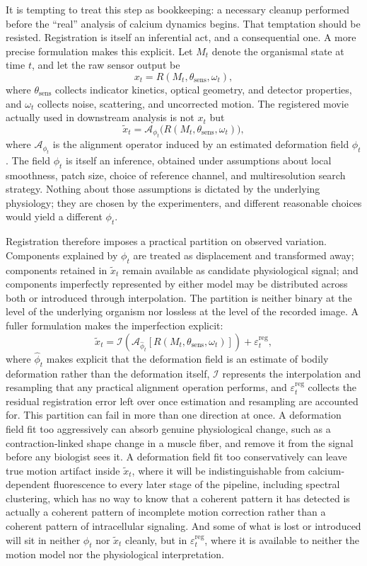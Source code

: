 \documentclass[11pt]{article}
\begin{document}
It is tempting to treat this step as bookkeeping: a necessary cleanup performed before the ``real'' analysis of calcium dynamics begins. That temptation should be resisted. Registration is itself an inferential act, and a consequential one. A more precise formulation makes this explicit. Let $M_t$ denote the organismal state at time $t$, and let the raw sensor output be
\[
x_t = R(M_t, \theta_{\mathrm{sens}}, \omega_t),
\]
where $\theta_{\mathrm{sens}}$ collects indicator kinetics, optical geometry, and detector properties, and $\omega_t$ collects noise, scattering, and uncorrected motion. The registered movie actually used in downstream analysis is not $x_t$ but
\[
\tilde{x}_t = \mathcal{A}_{\phi_t}\big(R(M_t, \theta_{\mathrm{sens}}, \omega_t)\big),
\]
where $\mathcal{A}_{\phi_t}$ is the alignment operator induced by an estimated deformation field $\phi_t$. The field $\phi_t$ is itself an inference, obtained under assumptions about local smoothness, patch size, choice of reference channel, and multiresolution search strategy. Nothing about those assumptions is dictated by the underlying physiology; they are chosen by the experimenters, and different reasonable choices would yield a different $\phi_t$.

Registration therefore imposes a practical partition on observed variation. Components explained by $\phi_t$ are treated as displacement and transformed away; components retained in $\tilde{x}_t$ remain available as candidate physiological signal; and components imperfectly represented by either model may be distributed across both or introduced through interpolation. The partition is neither binary at the level of the underlying organism nor lossless at the level of the recorded image. A fuller formulation makes the imperfection explicit:
\[
\tilde{x}_t
=
\mathcal{I}\!\left(
\mathcal{A}_{\widehat{\phi}_t}
\left[
R(M_t,\theta_{\mathrm{sens}},\omega_t)
\right]
\right)
+\varepsilon^{\mathrm{reg}}_t,
\]
where $\widehat{\phi}_t$ makes explicit that the deformation field is an estimate of bodily deformation rather than the deformation itself, $\mathcal{I}$ represents the interpolation and resampling that any practical alignment operation performs, and $\varepsilon^{\mathrm{reg}}_t$ collects the residual registration error left over once estimation and resampling are accounted for. This partition can fail in more than one direction at once. A deformation field fit too aggressively can absorb genuine physiological change, such as a contraction-linked shape change in a muscle fiber, and remove it from the signal before any biologist sees it. A deformation field fit too conservatively can leave true motion artifact inside $\tilde{x}_t$, where it will be indistinguishable from calcium-dependent fluorescence to every later stage of the pipeline, including spectral clustering, which has no way to know that a coherent pattern it has detected is actually a coherent pattern of incomplete motion correction rather than a coherent pattern of intracellular signaling. And some of what is lost or introduced will sit in neither $\phi_t$ nor $\tilde{x}_t$ cleanly, but in $\varepsilon^{\mathrm{reg}}_t$, where it is available to neither the motion model nor the physiological interpretation.
\end{document}
